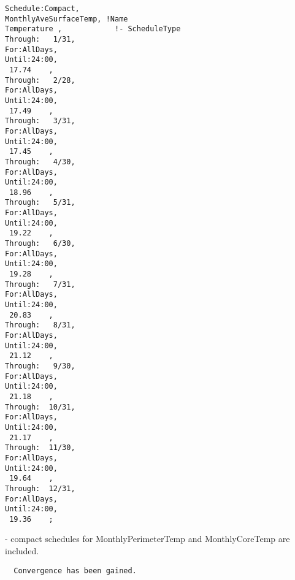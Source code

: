 \begin{lstlisting}
Schedule:Compact,
MonthlyAveSurfaceTemp, !Name
Temperature ,            !- ScheduleType
Through:   1/31,
For:AllDays,
Until:24:00,
 17.74    ,
Through:   2/28,
For:AllDays,
Until:24:00,
 17.49    ,
Through:   3/31,
For:AllDays,
Until:24:00,
 17.45    ,
Through:   4/30,
For:AllDays,
Until:24:00,
 18.96    ,
Through:   5/31,
For:AllDays,
Until:24:00,
 19.22    ,
Through:   6/30,
For:AllDays,
Until:24:00,
 19.28    ,
Through:   7/31,
For:AllDays,
Until:24:00,
 20.83    ,
Through:   8/31,
For:AllDays,
Until:24:00,
 21.12    ,
Through:   9/30,
For:AllDays,
Until:24:00,
 21.18    ,
Through:  10/31,
For:AllDays,
Until:24:00,
 21.17    ,
Through:  11/30,
For:AllDays,
Until:24:00,
 19.64    ,
Through:  12/31,
For:AllDays,
Until:24:00,
 19.36    ;
\end{lstlisting}

 - compact schedules for MonthlyPerimeterTemp and MonthlyCoreTemp are included.

\begin{lstlisting}
  Convergence has been gained.
\end{lstlisting}
